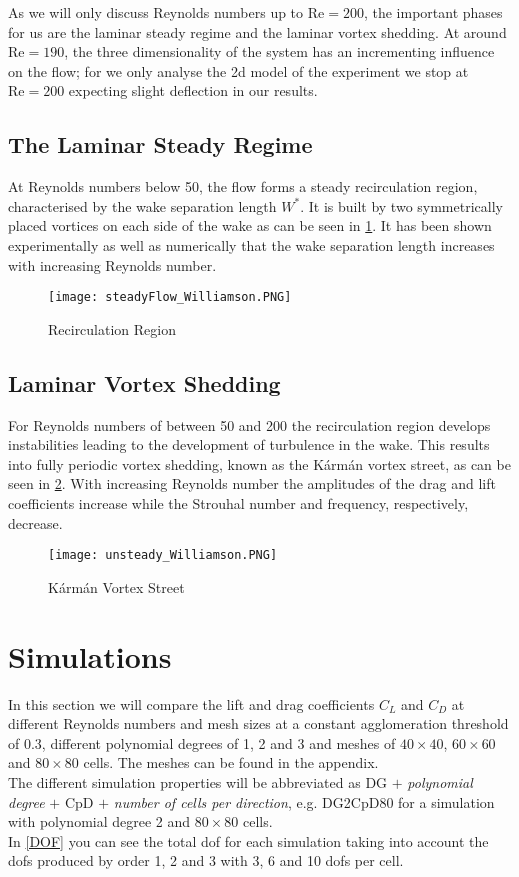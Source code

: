 	As we will only discuss Reynolds numbers up to $\text{Re} = 200$, the important phases for us are the laminar steady regime and the laminar vortex shedding. At around $\text{Re} = 190$, the three dimensionality of the system has an incrementing influence on the flow; for we only analyse the \gls{2d} model of the experiment we stop at $\text{Re} = 200$ expecting slight deflection in our results.
	
	\subsection{The Laminar Steady Regime}
	
	At Reynolds numbers below 50, the flow forms a steady recirculation region, characterised by the wake separation length  $W^*$. It is built by two symmetrically placed vortices on each side of the wake as can be seen in \cref{fig:steady}. It has been shown experimentally as well as numerically that the wake separation length increases with increasing Reynolds number. 
		\begin{figure}[htp]
			\centering
			\texttt{[image: steadyFlow\_Williamson.PNG]}
			\caption{Recirculation Region \cite{williamson1996vortex}}
			\label{fig:steady}
		\end{figure}
	\subsection{Laminar Vortex Shedding}
	For Reynolds numbers of between 50 and 200 the recirculation region develops instabilities leading to the development of turbulence in the wake. This results into fully periodic vortex shedding, known as the Kármán vortex street, as can be seen in \cref{fig:unsteady}. With increasing Reynolds number the amplitudes of the drag and lift coefficients increase while the Strouhal number and frequency, respectively, decrease.
	
		\begin{figure}[htp]
			\centering
			\texttt{[image: unsteady\_Williamson.PNG]}
			\caption{Kármán Vortex Street \cite{williamson1996vortex}}
			\label{fig:unsteady}
		\end{figure}
		
\section{Simulations}
	In this section we will compare the lift and drag coefficients $C_L$ and $C_D$ at different Reynolds numbers and mesh sizes at a constant agglomeration threshold of $0.3$, different polynomial degrees of 1, 2 and 3 and meshes of $40 \times 40$, $60 \times 60$ and $80 \times 80$ cells. The meshes can be found in the appendix. \\\indent
	The different simulation properties will be abbreviated as DG $+$ \textit{polynomial degree} $+$ CpD $+$ \textit{number of cells per direction}, e.g. DG2CpD80 for a simulation with polynomial degree 2 and $80 \times 80$ cells.\\
	In \cref{DOF} you can see the total \gls{dof} for each simulation taking into account the \gls{dof}s produced by order 1, 2 and 3 with 3, 6 and 10 \gls{dof}s per cell.
	
